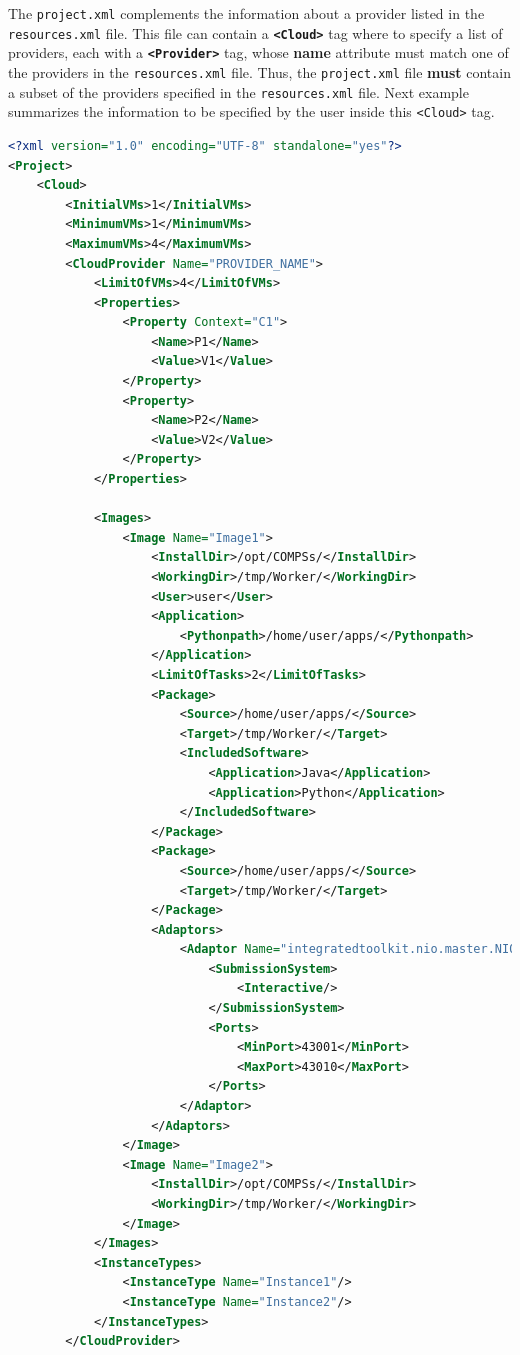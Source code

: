 The \texttt{project.xml} complements the information about a provider listed in the \texttt{resources.xml} file. 
This file can contain a \textbf{\texttt{<Cloud>}} tag where to specify a list of providers, each with a \textbf{\texttt{<Provider>}} tag,
whose \textbf{name} attribute must match one of the providers in the \texttt{resources.xml} file. Thus, the \texttt{project.xml}
file \textbf{must} contain a subset of the providers specified in the \texttt{resources.xml} file. Next example summarizes 
the information to be specified by the user inside this \texttt{<Cloud>} tag.
\begin{lstlisting}[language=xml]
<?xml version="1.0" encoding="UTF-8" standalone="yes"?>
<Project>
    <Cloud>
        <InitialVMs>1</InitialVMs>
        <MinimumVMs>1</MinimumVMs>
        <MaximumVMs>4</MaximumVMs>
        <CloudProvider Name="PROVIDER_NAME">
            <LimitOfVMs>4</LimitOfVMs>
            <Properties>
                <Property Context="C1">
                    <Name>P1</Name>
                    <Value>V1</Value>
                </Property>
                <Property>
                    <Name>P2</Name>
                    <Value>V2</Value>
                </Property>
            </Properties>
            
            <Images>
                <Image Name="Image1">
                    <InstallDir>/opt/COMPSs/</InstallDir>
                    <WorkingDir>/tmp/Worker/</WorkingDir>
                    <User>user</User>
                    <Application>
                        <Pythonpath>/home/user/apps/</Pythonpath>
                    </Application>
                    <LimitOfTasks>2</LimitOfTasks>
                    <Package>
                        <Source>/home/user/apps/</Source>
                        <Target>/tmp/Worker/</Target>
                        <IncludedSoftware>
                            <Application>Java</Application>
                            <Application>Python</Application>
                        </IncludedSoftware>
                    </Package>
                    <Package>
                        <Source>/home/user/apps/</Source>
                        <Target>/tmp/Worker/</Target>
                    </Package>
                    <Adaptors>
                        <Adaptor Name="integratedtoolkit.nio.master.NIOAdaptor">
                            <SubmissionSystem>
                                <Interactive/>
                            </SubmissionSystem>
                            <Ports>
                                <MinPort>43001</MinPort>
                                <MaxPort>43010</MaxPort>
                            </Ports>
                        </Adaptor>
                    </Adaptors>
                </Image>
                <Image Name="Image2">
                    <InstallDir>/opt/COMPSs/</InstallDir>
                    <WorkingDir>/tmp/Worker/</WorkingDir>
                </Image>
            </Images>
            <InstanceTypes>
                <InstanceType Name="Instance1"/>
                <InstanceType Name="Instance2"/>
            </InstanceTypes>
        </CloudProvider>
        

\end{lstlisting}
